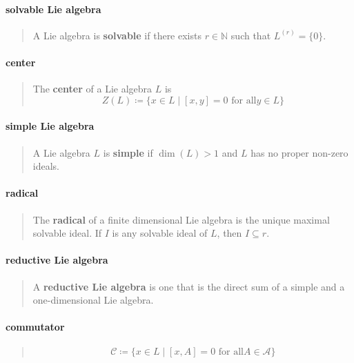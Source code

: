 \documentclass[letterpaper, 10pt]{article}
\theoremstyle{theostyle}
\begin{document}
\paragraph{solvable Lie algebra}
\begin{quote}
    A Lie algebra is \textbf{solvable} if there exists \(r \in \mathbb{N}\) such that \(L^{(r)} = \{0\}\).
\end{quote}

\paragraph{center}
\begin{quote}
    The \textbf{center} of a Lie algebra \(L\) is
    \[Z(L) \coloneqq \{x \in L \mid [x, y] = 0 \text{ for all} y \in L\}\]
\end{quote}

\paragraph{simple Lie algebra}
\begin{quote}
    A Lie algebra \(L\) is \textbf{simple} if \(\dim{(L)} > 1\) and \(L\) has no proper non-zero ideals.
\end{quote}

\paragraph{radical}
\begin{quote}
    The \textbf{radical} of a finite dimensional Lie algebra is the unique maximal solvable ideal.
    If \(I\) is any solvable ideal of \(L\), then \(I \subseteq r\).
\end{quote}

\paragraph{reductive Lie algebra}
\begin{quote}
    A \textbf{reductive Lie algebra} is one that is the direct sum of a simple and a one-dimensional Lie algebra.
\end{quote}

\paragraph{commutator}
\begin{quote}
    \[\mathcal{C} \coloneqq \{x \in L \mid [x, A] = 0 \text{ for all} A \in \mathcal{A}\}\]
\end{quote}
\end{document}
